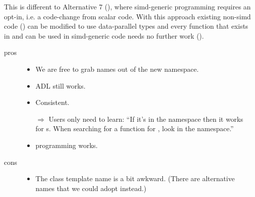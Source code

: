 This is different to Alternative 7 (), where simd-generic
programming requires an opt-in, i.e. a code-change from scalar code.
With this approach existing non-simd code () can be modified
to use data-parallel types and every function that exists in  and can
be used in simd-generic code needs no further work ().

\begin{description}
  \item[pros]
    \begin{itemize}
      \item We are free to grab names out of the new namespace.
      \item ADL still works.
      \item Consistent.
      \item[$\Rightarrow$] Users only need to learn: “If it's in the
        \std{} namespace then it works for s.
        When searching for a function for , look in the
        \std{} namespace.”
      \item \simdgeneric programming works.
    \end{itemize}

  \item[cons]
    \begin{itemize}
      \item The class template name \std{} is a bit awkward.
        (There are alternative names that we could adopt instead.)
    \end{itemize}
\end{description}

